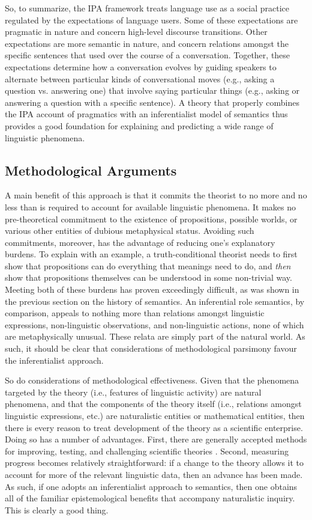 So, to summarize, the IPA framework treats language use as a social practice regulated by the expectations of language users. Some of these expectations are pragmatic in nature and concern high-level discourse transitions. Other expectations are more semantic in nature, and concern relations amongst the specific sentences that used over the course of a conversation. Together, these expectations determine how a conversation evolves by guiding speakers to alternate between particular kinds of conversational moves (e.g., asking a question vs. answering one) that involve saying particular things (e.g., asking or answering a question with a specific sentence). A theory that properly combines the IPA account of pragmatics with an inferentialist model of semantics thus provides a good foundation for explaining and predicting a wide range of linguistic phenomena. 

\subsection{Methodological Arguments}

A main benefit of this approach is that it commits the theorist to no more and no less than is required to account for available linguistic phenomena. It makes no pre-theoretical commitment to the existence of propositions, possible worlds, or various other entities of dubious metaphysical status. Avoiding such commitments, moreover, has the advantage of reducing one's explanatory burdens. To explain with an example, a truth-conditional theorist needs to first show that propositions can do everything that meanings need to do, and \textit{then} show that propositions themselves can be understood in some non-trivial way. Meeting both of these burdens has proven exceedingly difficult, as was shown in the previous section on the history of semantics. An inferential role semantics, by comparison, appeals to nothing more than relations amongst linguistic expressions, non-linguistic observations, and non-linguistic actions, none of which are metaphysically unusual. These relata are simply part of the natural world. As such, it should be clear that considerations of methodological parsimony favour the inferentialist approach. 

So do considerations of methodological effectiveness. Given that the phenomena targeted by the theory (i.e., features of linguistic activity) are natural phenomena, and that the components of the theory itself (i.e., relations amongst linguistic expressions, etc.) are naturalistic entities or mathematical entities, then there is every reason to treat development of the theory as a scientific enterprise. Doing so has a number of advantages. First, there are generally accepted methods for improving, testing, and challenging scientific theories \citep{GodfreySmith:2002}. Second, measuring progress becomes relatively straightforward: if a change to the theory allows it to account for more of the relevant linguistic data, then an advance has been made. As such, if one adopts an inferentialist approach to semantics, then one obtains all of the familiar epistemological benefits that accompany naturalistic inquiry. This is clearly a good thing.

